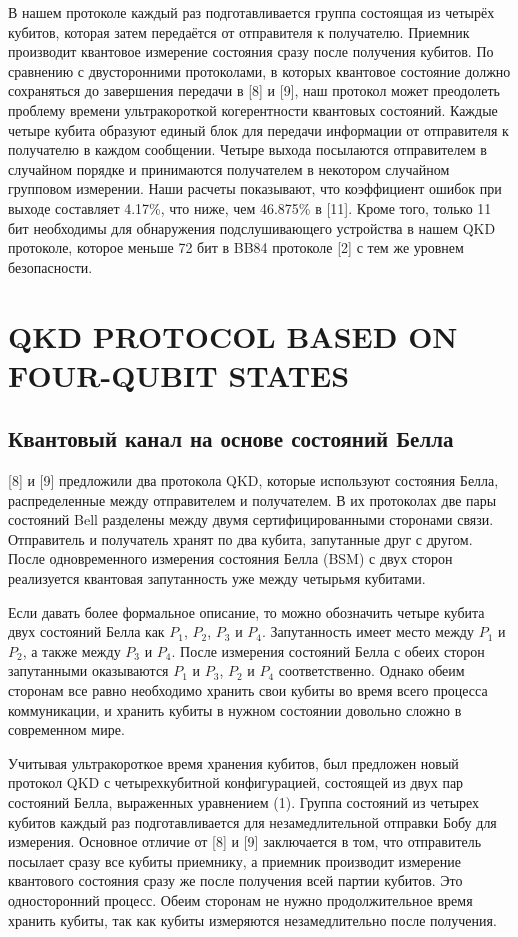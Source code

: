 \documentclass[a4paper,11pt]{article}
\begin{document}
В нашем протоколе каждый раз подготавливается группа состоящая из четырёх кубитов, которая затем передаётся от отправителя к получателю. Приемник производит квантовое измерение состояния сразу после получения кубитов. По сравнению с двусторонними протоколами, в которых квантовое состояние должно сохраняться до завершения передачи в [8] и [9], наш протокол может преодолеть проблему времени ультракороткой когерентности квантовых состояний. Каждые четыре кубита образуют единый блок для передачи информации от отправителя к получателю в каждом сообщении. Четыре выхода посылаются отправителем в случайном порядке и принимаются получателем в некотором случайном групповом измерении. Наши расчеты показывают, что коэффициент ошибок при выходе составляет 4.17\%, что ниже, чем 46.875\% в [11]. Кроме того, только 11 бит необходимы для обнаружения подслушивающего устройства в нашем QKD протоколе, которое меньше 72 бит в BB84 протоколе [2] с тем же уровнем безопасности.
\section{QKD PROTOCOL BASED ON FOUR-QUBIT STATES}

\subsection{Квантовый канал на основе состояний Белла}
[8] и [9] предложили два протокола QKD, которые используют состояния Белла, распределенные между отправителем и получателем. В их протоколах две пары состояний Bell разделены между двумя сертифицированными сторонами связи. Отправитель и получатель хранят по два кубита, запутанные друг с другом. После одновременного измерения состояния Белла (BSM) с двух сторон реализуется квантовая запутанность уже между четырьмя кубитами.

Если давать более формальное описание, то можно обозначить четыре кубита двух состояний Белла как $P_1$, $P_2$, $P_3$ и $P_4$. Запутанность имеет место между $P_1$ и $P_2$, а также между $P_3$ и $P_4$. После измерения состояний Белла с обеих сторон запутанными оказываются $P_1$ и $P_3$, $P_2$ и $P_4$ соответственно. Однако обеим сторонам все равно необходимо хранить свои кубиты во время всего процесса коммуникации, и хранить кубиты в нужном состоянии довольно сложно в современном мире.


Учитывая ультракороткое время хранения кубитов, был предложен новый протокол QKD с четырехкубитной конфигурацией, состоящей из двух пар состояний Белла, выраженных уравнением (1). Группа состояний из четырех кубитов каждый раз подготавливается для незамедлительной отправки Бобу для измерения. Основное отличие от [8] и [9] заключается в том, что отправитель посылает сразу все кубиты приемнику, а приемник производит измерение квантового состояния сразу же после получения всей партии кубитов. Это односторонний процесс. Обеим сторонам не нужно продолжительное время хранить кубиты, так как кубиты измеряются незамедлительно после получения.
\end{document}
